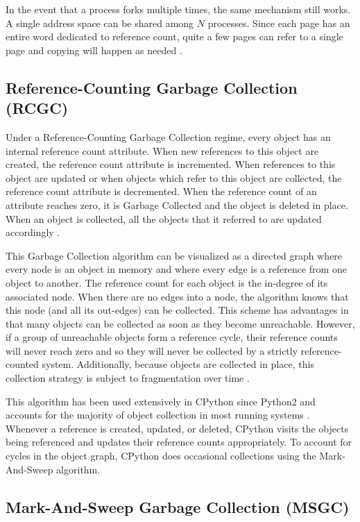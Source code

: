 \documentclass{article}
\begin{document}
\begin{sloppypar}
In the event that a process forks multiple times, the same mechanism still works.  A single address space can be shared among $N$ processes.  Since each page has an entire word dedicated to reference count, quite a few pages can refer to a single page and copying will happen as needed \cite{kernelsource,VMM}.  

\subsection{Reference-Counting Garbage Collection (RCGC)}\label{sec:RCGC}

Under a Reference-Counting Garbage Collection regime, every object has an internal reference count attribute.  When new references to this object are created, the reference count attribute is incremented.  When references to this object are updated or when objects which refer to this object are collected, the reference count attribute is decremented.  When the reference count of an attribute reaches zero, it is Garbage Collected  and the object is deleted in place.  When an object is collected, all the objects that it referred to are updated accordingly \cite{GC-continuum}.  

This Garbage Collection algorithm can be visualized as a directed graph where every node is an object in memory and where every edge is a reference from one object to another.  The reference count for each object is the in-degree of its associated node.  When there are no edges into a node, the algorithm knows that this node (and all its out-edges) can be collected.  This scheme has advantages in that many objects can be collected as soon as they become unreachable.  However, if a group of unreachable objects form a reference cycle, their reference counts will never reach zero and so they will never be collected by a strictly reference-counted system.  Additionally, because objects are collected in place, this collection strategy is subject to fragmentation over time \cite{GC-continuum}.  

This algorithm has been used extensively in CPython since Python2 and accounts for the majority of object collection in most running systems \cite{cpython3-doc}.  Whenever a reference is created, updated, or deleted, CPython visits the objects being referenced and updates their reference counts appropriately.  To account for cycles in the object graph, CPython does occasional collections using the Mark-And-Sweep algorithm.  

\subsection{Mark-And-Sweep Garbage Collection (MSGC)}\label{sec:MSGC}


\end{sloppypar}
\end{document}
